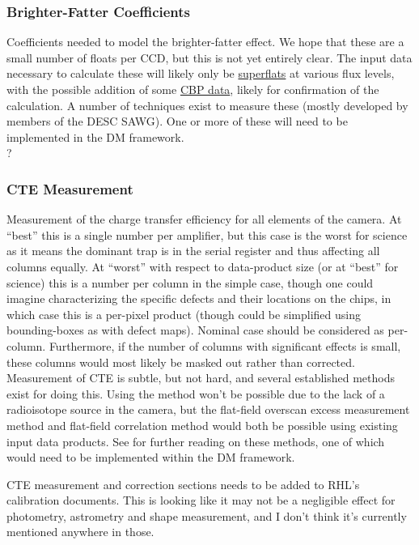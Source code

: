 \subsubsection{Brighter-Fatter Coefficients}\label{sec:CPP:output:brighterFatterCoeffs}
Coefficients needed to model the brighter-fatter effect. We hope that these are a small number of floats per CCD, but this is not yet entirely clear. The input data necessary to calculate these will likely only be \hyperref[sec:CPP:inputs:broadFlat]{superflats} at various flux levels, with the possible addition of some \hyperref[sec:CPP:inputs:CBP]{CBP data}, likely for confirmation of the calculation.
\alg A number of techniques exist to measure these (mostly developed by members of the DESC SAWG). One or more of these will need to be implemented in the DM framework. 
\\ \dragons ?


\subsubsection{CTE Measurement}\label{sec:CPP:output:CTE}
Measurement of the charge transfer efficiency for all elements of the camera. At ``best'' this is a single number per amplifier, but this case is the worst for science as it means the dominant trap is in the serial register and thus affecting all columns equally. At ``worst'' with respect to data-product size (or at ``best'' for science) this is a number per column in the simple case, though one could imagine characterizing the specific defects and their locations on the chips, in which case this is a per-pixel product (though could be simplified using bounding-boxes as with defect maps). Nominal case should be considered as per-column. Furthermore, if the number of columns with significant effects is small, these columns would most likely be masked out rather than corrected.
\alg Measurement of CTE is subtle, but not hard, and several established methods exist for doing this. Using the \fefiftyfive method won't be possible due to the lack of a radioisotope source in the camera, but the flat-field overscan excess measurement method and flat-field correlation method would both be possible using existing input data products. See \XXX{} for further reading on these methods, one of which would need to be implemented within the DM framework.
\begin{note}
	CTE measurement and correction sections needs to be added to RHL's calibration documents. This is looking like it may not be a negligible effect for photometry, astrometry and shape measurement, and I don't think it's currently mentioned anywhere in those.
\end{note}


